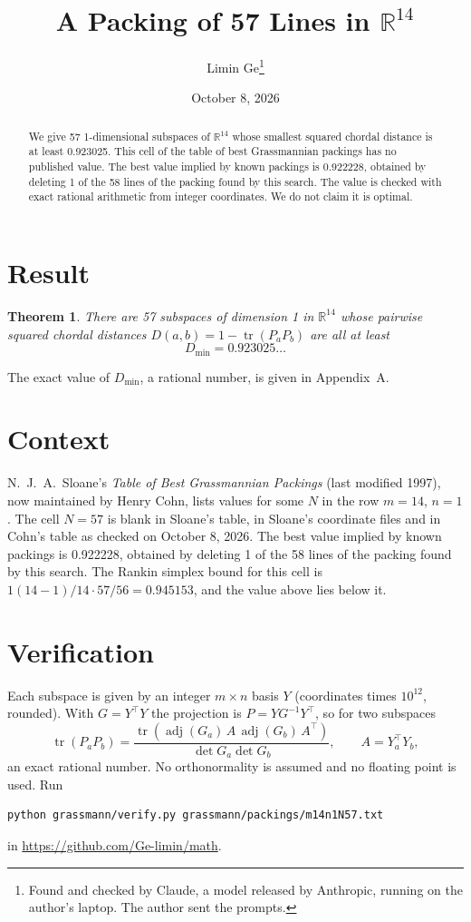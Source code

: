 \documentclass[11pt,a4paper]{article}
\title{A Packing of 57 Lines in $\mathbb{R}^{14}$}
\author{Limin Ge\thanks{Found and checked by Claude, a model released by Anthropic, running on the author's laptop. The author sent the prompts.}}
\date{October 8, 2026}
\newtheorem*{theorem}{Theorem}
\begin{document}
\maketitle
\begin{abstract}
We give 57 1-dimensional subspaces of $\mathbb{R}^{14}$ whose smallest squared chordal distance is at least 0.923025. This cell of the table of best Grassmannian packings has no published value. The best value implied by known packings is 0.922228, obtained by deleting 1 of the 58 lines of the packing found by this search. The value is checked with exact rational arithmetic from integer coordinates. We do not claim it is optimal.
\end{abstract}

\section{Result}
\begin{theorem}
There are 57 subspaces of dimension 1 in $\mathbb{R}^{14}$ whose pairwise squared chordal distances $D(a,b) = 1 - \operatorname{tr}(P_aP_b)$ are all at least
\[ D_{\min} = 0.923025\ldots \]
\end{theorem}
The exact value of $D_{\min}$, a rational number, is given in Appendix~A.


\section{Context}
N.~J.~A.~Sloane's \emph{Table of Best Grassmannian Packings} (last modified 1997), now maintained by Henry Cohn, lists values for some $N$ in the row $m=14$, $n=1$. The cell $N=57$ is blank in Sloane's table, in Sloane's coordinate files and in Cohn's table as checked on October 8, 2026. The best value implied by known packings is 0.922228, obtained by deleting 1 of the 58 lines of the packing found by this search. The Rankin simplex bound for this cell is $1(14-1)/14\cdot 57/56 = 0.945153$, and the value above lies below it.


\section{Verification}
Each subspace is given by an integer $m\times n$ basis $Y$ (coordinates times $10^{12}$, rounded). With $G=Y^\top Y$ the projection is $P=YG^{-1}Y^\top$, so for two subspaces
\[ \operatorname{tr}(P_aP_b)=\frac{\operatorname{tr}(\operatorname{adj}(G_a)\,A\,\operatorname{adj}(G_b)\,A^\top)}{\det G_a\det G_b},\qquad A=Y_a^\top Y_b, \]
an exact rational number. No orthonormality is assumed and no floating point is used. Run
\begin{verbatim}
python grassmann/verify.py grassmann/packings/m14n1N57.txt
\end{verbatim}
in \url{https://github.com/Ge-limin/math}.
\end{document}
